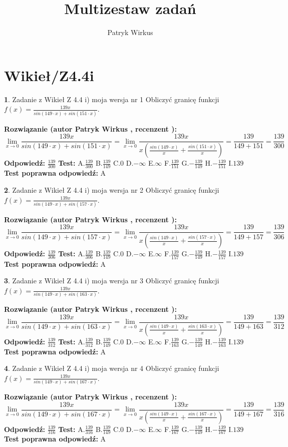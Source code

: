 \documentclass[12pt, a4paper]{article}
\title{Multizestaw zadań}
\author{Patryk Wirkus}
\date{}
\theoremstyle{definition} %
\newtheorem{zad}{}
\newcommand{\kategoria}[1]{\section{#1}}
\newcommand{\zadStart}[1]{\begin{zad}#1\newline}
\newcommand{\zadStop}{\end{zad}}
\newcommand{\rozwStart}[2]{\noindent \textbf{Rozwiązanie (autor #1 , recenzent #2): }\newline}
\newcommand{\rozwStop}{\newline}
\newcommand{\odpStart}{\noindent \textbf{Odpowiedź:}\newline}
\newcommand{\odpStop}{\newline}
\newcommand{\testStart}{\noindent \textbf{Test:}\newline}
\newcommand{\testStop}{\newline}
\newcommand{\kluczStart}{\noindent \textbf{Test poprawna odpowiedź:}\newline}
\newcommand{\kluczStop}{\newline}
\begin{document}
\maketitle

\kategoria{Wikieł/Z4.4i}


\zadStart{Zadanie z Wikieł Z 4.4 i) moja wersja nr 1}
Obliczyć granicę funkcji $f(x)=\frac{139x}{sin(149\cdot x) +sin(151\cdot x)}$.
\zadStop
\rozwStart{Patryk Wirkus}{}
$$\lim\limits_{x\to 0}\frac{139x}{sin(149\cdot x) +sin(151\cdot x)}=\lim\limits_{x\to 0}\frac{139x}{x(\frac{sin(149\cdot x)}{x}+\frac{sin(151\cdot x)}{x})}=\frac{139}{149+151} = \frac{139}{300}$$
\rozwStop
\odpStart
$\frac{139}{300}$
\odpStop
\testStart
A.$\frac{139}{300}$
B.$\frac{139}{149}$
C.$0$
D.$-\infty$
E.$\infty$
F.$\frac{139}{151}$
G.$-\frac{139}{149}$
H.$-\frac{139}{151}$
I.$139$
\testStop
\kluczStart
A
\kluczStop



\zadStart{Zadanie z Wikieł Z 4.4 i) moja wersja nr 2}
Obliczyć granicę funkcji $f(x)=\frac{139x}{sin(149\cdot x) +sin(157\cdot x)}$.
\zadStop
\rozwStart{Patryk Wirkus}{}
$$\lim\limits_{x\to 0}\frac{139x}{sin(149\cdot x) +sin(157\cdot x)}=\lim\limits_{x\to 0}\frac{139x}{x(\frac{sin(149\cdot x)}{x}+\frac{sin(157\cdot x)}{x})}=\frac{139}{149+157} = \frac{139}{306}$$
\rozwStop
\odpStart
$\frac{139}{306}$
\odpStop
\testStart
A.$\frac{139}{306}$
B.$\frac{139}{149}$
C.$0$
D.$-\infty$
E.$\infty$
F.$\frac{139}{157}$
G.$-\frac{139}{149}$
H.$-\frac{139}{157}$
I.$139$
\testStop
\kluczStart
A
\kluczStop



\zadStart{Zadanie z Wikieł Z 4.4 i) moja wersja nr 3}
Obliczyć granicę funkcji $f(x)=\frac{139x}{sin(149\cdot x) +sin(163\cdot x)}$.
\zadStop
\rozwStart{Patryk Wirkus}{}
$$\lim\limits_{x\to 0}\frac{139x}{sin(149\cdot x) +sin(163\cdot x)}=\lim\limits_{x\to 0}\frac{139x}{x(\frac{sin(149\cdot x)}{x}+\frac{sin(163\cdot x)}{x})}=\frac{139}{149+163} = \frac{139}{312}$$
\rozwStop
\odpStart
$\frac{139}{312}$
\odpStop
\testStart
A.$\frac{139}{312}$
B.$\frac{139}{149}$
C.$0$
D.$-\infty$
E.$\infty$
F.$\frac{139}{163}$
G.$-\frac{139}{149}$
H.$-\frac{139}{163}$
I.$139$
\testStop
\kluczStart
A
\kluczStop



\zadStart{Zadanie z Wikieł Z 4.4 i) moja wersja nr 4}
Obliczyć granicę funkcji $f(x)=\frac{139x}{sin(149\cdot x) +sin(167\cdot x)}$.
\zadStop
\rozwStart{Patryk Wirkus}{}
$$\lim\limits_{x\to 0}\frac{139x}{sin(149\cdot x) +sin(167\cdot x)}=\lim\limits_{x\to 0}\frac{139x}{x(\frac{sin(149\cdot x)}{x}+\frac{sin(167\cdot x)}{x})}=\frac{139}{149+167} = \frac{139}{316}$$
\rozwStop
\odpStart
$\frac{139}{316}$
\odpStop
\testStart
A.$\frac{139}{316}$
B.$\frac{139}{149}$
C.$0$
D.$-\infty$
E.$\infty$
F.$\frac{139}{167}$
G.$-\frac{139}{149}$
H.$-\frac{139}{167}$
I.$139$
\testStop
\kluczStart
A
\kluczStop
\end{document}
